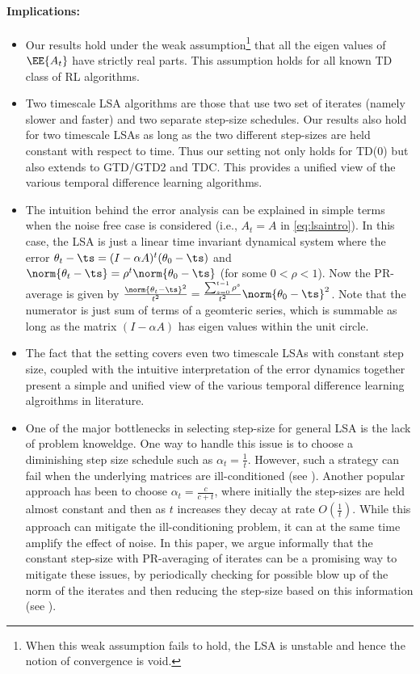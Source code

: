\paragraph{Implications:}
\begin{itemize}[leftmargin=*, before = \leavevmode\vspace{-\baselineskip}]
\item Our results hold under the weak assumption\footnote{When this weak assumption fails to hold, the LSA is unstable and hence the notion of convergence is void.} that all the eigen values of $\EE{A_t}$ have strictly real parts. This assumption holds for all known TD class of RL algorithms.
\item Two timescale LSA algorithms are those that use two set of iterates (namely slower and faster) and two separate step-size schedules. Our results also hold for two timescale LSAs as long as the two different step-sizes are held constant with respect to time. Thus our setting not only holds for TD(0) but also extends to GTD/GTD2 and TDC. This provides a unified view of the various temporal difference learning algorithms.
\item The intuition behind the error analysis can be explained in simple terms when the noise free case is considered (i.e., $A_t=A$ in \eqref{eq:lsaintro}). In this case, the LSA is just a linear time invariant dynamical system where the error $\theta_t-\ts=(I-\alpha A)^t (\theta_0-\ts)$ and $\norm{\theta_t-\ts}=\rho^t\norm{\theta_0-\ts}$ (for some $0<\rho<1$). Now the PR-average is given by $\frac{\norm{\theta_t-\ts}^2}{t^2}=\frac{\sum_{s=0}^{t-1}\rho^s}{t^2} \norm{\theta_0-\ts}^2$. Note that the numerator is just sum of terms of a geomteric series, which is summable as long as the matrix $(I-\alpha A)$ has eigen values within the unit circle.
\item The fact that the setting covers even two timescale LSAs with constant step size, coupled with the intuitive interpretation of the error dynamics together present a simple and unified view of the various temporal difference learning algroithms in literature.
\item One of the major bottlenecks in selecting step-size for general LSA is the lack of problem knoweldge. One way to handle this issue is to choose a diminishing step size schedule such as $\alpha_t=\frac{1}{t}$. However, such a strategy can fail when the underlying matrices are ill-conditioned (see ). Another popular approach has been to choose $\alpha_t=\frac{c}{c+t}$, where initially the step-sizes are held almost constant and then as $t$ increases they decay at rate $O(\frac{1}{t})$. While this approach can mitigate the ill-conditioning problem, it can at the same time amplify the effect of noise. In this paper, we argue informally that the constant step-size with PR-averaging of iterates can be a promising way to mitigate these issues, by periodically checking for possible blow up of the norm of the iterates and then reducing the step-size based on this information (see ).
\end{itemize}
